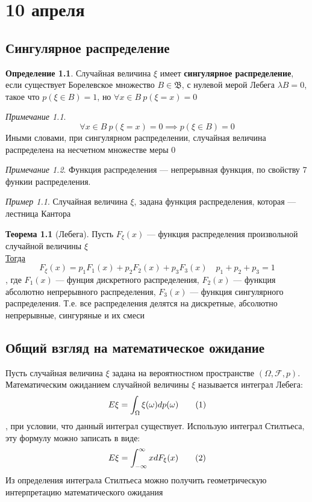 \documentclass[oneside]{book}
\newcommand\addtag{\refstepcounter{equation}\tag{\theequation}}
\newcommand{\todo}{{\color{red}\fbox{\text{Доделать}}}}
\theoremstyle{plain}
\theoremstyle{remark}
\newtheorem*{remark}{Примечание}
\newtheorem*{examp}{Пример}
\theoremstyle{definition}
\newtheorem{theorem}{Теорема}[section]
\newtheorem*{definition}{Определение}
\begin{document}
\chapter{10 апреля}
\label{sec:org33f4861}
\section{Сингулярное распределение}
\label{sec:orgf384da8}
\begin{definition}
Случайная величина \(\xi\) имеет \textbf{сингулярное распределение}, если существует Борелевское множество \(B \in \mathfrak{B}\), с нулевой мерой Лебега \(\lambda B = 0\), такое что \(p(\xi \in B) = 1\), но \(\forall x \in B\ p(\xi = x) = 0\) 
\end{definition}
\begin{remark}
\[ \forall x \in B\ p(\xi = x) = 0 \implies p(\xi \in B) = 0 \]
Иными словами, при сингулярном распределении, случайная величина распределена на несчетном множестве меры 0
\end{remark}
\begin{remark}
Функция распределения --- непрерывная функция, по свойству 7 функии распределения.
\end{remark}
\begin{examp}
Случайная величина \(\xi\), задана функция распределения, которая --- лестница Кантора
\todo
\end{examp}
\begin{theorem}[Лебега]
Пусть \(F_\xi(x)\) --- функция распределения произвольной случайной величины \(\xi\) \\
\uline{Тогда}
\[ F_\xi(x) = p_1F_1(x) + p_2F_2(x) + p_3F_3(x) \quad p_1 + p_2 + p_3 = 1\]
, где \(F_1(x)\) --- фунция дискретного распределения, \(F_2(x)\) --- функция абсолютно непрерывного распределения, \(F_3(x)\) --- функция сингулярного распределения. Т.е. все распределения делятся на дискретные, абсолютно непрерывные, сингуряные и их смеси
\end{theorem}
\section{Общий взгляд на математическое ожидание}
\label{sec:orga549cd9}
Пусть случайная величина \(\xi\) задана на вероятностном пространстве \((\Omega, \mathcal{F}, p)\). Математическим ожиданием случайной величины \(\xi\) называется интеграл Лебега:
\[ E\xi = \int_\Omega \xi(\omega) dp(\omega) \addtag\label{int_1_9} \], при условии, что данный интеграл существует. Использую интеграл Стилтьеса, эту формулу можно записать в виде:
\[ E\xi = \int_{-\infty}^{\infty} x dF_\xi(x) \addtag\label{int_2_9} \]
Из определения интеграла Стилтьеса можно получить геометрическую интерпретацию математического ожидания
\end{document}
